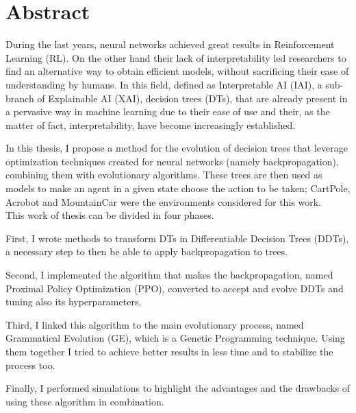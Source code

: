 \chapter*{Abstract} %
\label{abstract}


During the last years, neural networks achieved great results in Reinforcement Learning (RL). On the other hand their lack of interpretability led researchers to find an alternative way to obtain efficient models, without sacrificing their ease of understanding by humans. In this field, defined as Interpretable AI (IAI), a sub-branch of Explainable AI (XAI), decision trees (DTs), that are already present in a pervasive way in machine learning due to their ease of use and their, as the matter of fact, interpretability, have become increasingly established.

In this thesis, I propose a method for the evolution of decision trees that leverage optimization techniques created for neural networks (namely backpropagation), combining them with evolutionary algorithms. These trees are then used as models to make an agent in a given state choose the action to be taken; CartPole, Acrobot and MountainCar were the environments considered for this work.\\This work of thesis can be divided in four phases.

First, I wrote methods to transform DTs in Differentiable Decision Trees (DDTs), a necessary step to then be able to apply backpropagation to trees.

Second, I implemented the algorithm that makes the backpropagation, named Proximal Policy Optimization (PPO), converted to accept and evolve DDTs and tuning also its hyperparameters.

Third, I linked this algorithm to the main evolutionary process, named Grammatical Evolution (GE), which is a Genetic Programming technique. Using them together I tried to achieve better results in less time and to stabilize the process too.

Finally, I performed simulations to highlight the advantages and the drawbacks of using these algorithm in combination.

\newpage